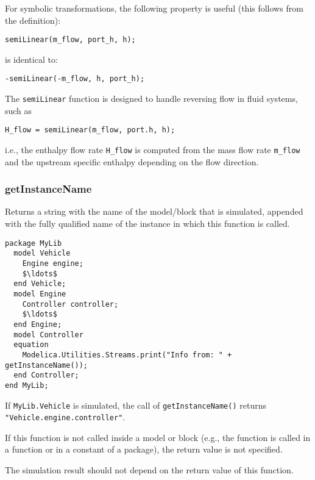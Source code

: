 \begin{nonnormative}
For symbolic transformations, the following property is useful (this follows from the definition):
\begin{lstlisting}[language=modelica]
semiLinear(m_flow, port_h, h);
\end{lstlisting}
is identical to:
\begin{lstlisting}[language=modelica]
-semiLinear(-m_flow, h, port_h);
\end{lstlisting}

The \lstinline!semiLinear! function is designed to handle reversing flow in fluid systems, such as
\begin{lstlisting}[language=modelica]
H_flow = semiLinear(m_flow, port.h, h);
\end{lstlisting}
i.e., the enthalpy flow rate \lstinline!H_flow! is computed from the mass flow rate \lstinline!m_flow! and the upstream specific enthalpy depending on the flow direction.
\end{nonnormative}

\subsubsection{getInstanceName}\label{getinstancename}

Returns a string with the name of the model/block that is simulated, appended with the fully qualified name of the instance in which this function is called.

\begin{example}
\begin{lstlisting}[language=modelica]
package MyLib
  model Vehicle
    Engine engine;
    $\ldots$
  end Vehicle;
  model Engine
    Controller controller;
    $\ldots$
  end Engine;
  model Controller
  equation
    Modelica.Utilities.Streams.print("Info from: " + getInstanceName());
  end Controller;
end MyLib;
\end{lstlisting}
If \lstinline!MyLib.Vehicle! is simulated, the call of \lstinline!getInstanceName()! returns \lstinline!"Vehicle.engine.controller"!.
\end{example}

If this function is not called inside a model or block (e.g., the function is called in a function or in a constant of a package), the return value is not specified.

\begin{nonnormative}
The simulation result should not depend on the return value of this function.
\end{nonnormative}

